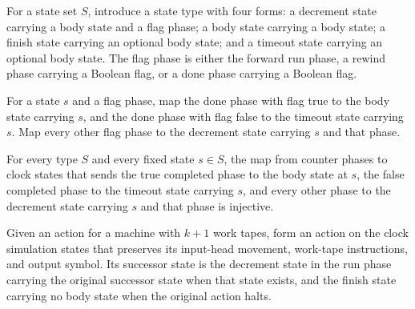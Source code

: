 \begin{definition}
\label{Turing.sc_State}
\leanok
{}
For a state set $S$, introduce a state type with four forms: a decrement state carrying
a body state and a flag phase; a body state carrying a body state; a finish state
carrying an optional body state; and a timeout state carrying an optional body state.
The flag phase is either the forward run phase, a rewind phase carrying a Boolean flag,
or a done phase carrying a Boolean flag.
\end{definition}

\begin{definition}
\label{Turing.sc_decExit}
\leanok
{}
For a state $s$ and a flag phase, map the done phase with flag true to the body state
carrying $s$, and the done phase with flag false to the timeout state carrying $s$. Map
every other flag phase to the decrement state carrying $s$ and that phase.
\end{definition}

\begin{theorem}
\label{Turing.sc_decExit_injective}
\leanok
{}
For every type $S$ and every fixed state $s\in S$, the map from counter phases to clock
states that sends the true completed phase to the body state at $s$, the false completed
phase to the timeout state carrying $s$, and every other phase to the decrement state
carrying $s$ and that phase is injective.
\end{theorem}

\begin{definition}
\label{Turing.sc_bodyAct}
\leanok
{}
Given an action for a machine with $k+1$ work tapes, form an action on the clock
simulation states that preserves its input-head movement, work-tape instructions, and
output symbol. Its successor state is the decrement state in the run phase carrying the
original successor state when that state exists, and the finish state carrying no body
state when the original action halts.
\end{definition}

